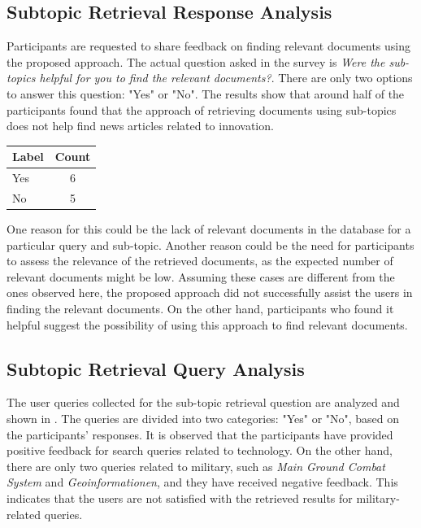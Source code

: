 \subsection{Subtopic Retrieval Response Analysis}

Participants are requested to share feedback on finding relevant documents using the proposed approach. The actual question asked in the survey is \emph{Were the sub-topics helpful for you to find the relevant documents?}. There are only two options to answer this question: "Yes" or "No". The results show that around half of the participants found that the approach of retrieving documents using sub-topics does not help find news articles related to innovation.



\begin{center}
	\label{tab:question_5_results}
	\begin{tabularx}{.3\textwidth}{|Y|c|}
		\hline
		Label & Count \\
		\hline
		Yes & 6 \\
		\hline
		No & 5 \\
		\hline
	\end{tabularx}
\end{center} 

One reason for this could be the lack of relevant documents in the database for a particular query and sub-topic. Another reason could be the need for participants to assess the relevance of the retrieved documents, as the expected number of relevant documents might be low. Assuming these cases are different from the ones observed here, the proposed approach did not successfully assist the users in finding the relevant documents. On the other hand, participants who found it helpful suggest the possibility of using this approach to find relevant documents.

\subsection{Subtopic Retrieval Query Analysis}

The user queries collected for the sub-topic retrieval question are analyzed and shown in . The queries are divided into two categories: "Yes" or "No", based on the participants' responses. It is observed that the participants have provided positive feedback for search queries related to technology. On the other hand, there are only two queries related to military, such as \emph{Main Ground Combat System} and \emph{Geoinformationen}, and they have received negative feedback. This indicates that the users are not satisfied with the retrieved results for military-related queries.

